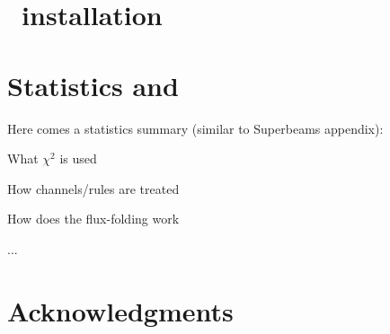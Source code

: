 
\begin{appendix}

\chapter{\GLOBES\ installation}
\label{app:installation}

\chapter{Statistics and \GLOBES }

Here comes a statistics summary (similar to Superbeams appendix):
\bi
\item
 What $\chi^2$ is used
\item
 How channels/rules are treated
\item
 How does the flux-folding work
\item
 ...
\ei





\chapter*{Acknowledgments}

\end{appendix}
